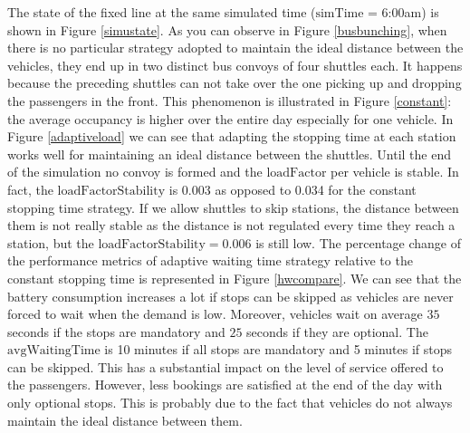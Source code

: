 \documentclass[12pt,a4paper]{article}
\begin{document}
The state of the fixed line at the same simulated time ($\text{simTime}$ = 6:00am) is shown in Figure \ref{simustate}. As you can observe in Figure \ref{busbunching}, when there is no particular strategy adopted to maintain the ideal distance between the vehicles, they end up in two distinct bus convoys of four shuttles each. It happens because the preceding shuttles can not take over the one picking up and dropping the passengers in the front. This phenomenon is illustrated in Figure \ref{constant}: the average occupancy is higher over the entire day especially for one vehicle. In Figure \ref{adaptiveload} we can see that adapting the stopping time at each station works well for maintaining an ideal distance between the shuttles. Until the end of the simulation no convoy is formed and the $\text{loadFactor}$ per vehicle is stable. In fact, the $\text{loadFactorStability}$ is 0.003 as opposed to 0.034 for the constant stopping time strategy. If we allow shuttles to skip stations, the distance between them is not really stable as the distance is not regulated every time they reach a station, but the $\text{loadFactorStability} =  0.006$ is still low.  The percentage change of the performance metrics of adaptive waiting time strategy relative to the constant stopping time is represented in Figure \ref{hwcompare}. We can see that the battery consumption increases a lot if stops can be skipped as vehicles are never forced to wait when the demand is low. Moreover, vehicles wait on average $35$ seconds if the stops are mandatory and $25$ seconds if they are optional. The $\text{avgWaitingTime}$ is 10 minutes if all stops are mandatory and 5 minutes if stops can be skipped. This has a substantial impact on the level of service offered to the passengers. However, less bookings are satisfied at the end of the day with only optional stops. This is probably due to the fact that vehicles do not always maintain the ideal distance between them. 
\end{document}
